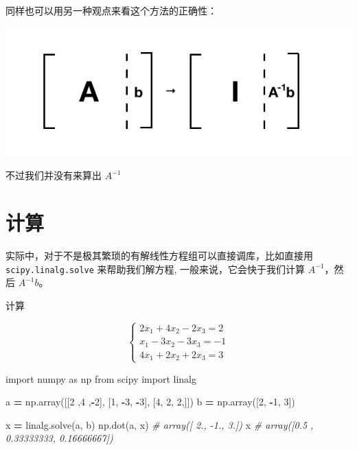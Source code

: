 \documentclass[
]{book}
\newenvironment{Shaded}{\begin{snugshade}}{\end{snugshade}}
\newcommand{\CommentTok}[1]{\textcolor[rgb]{0.56,0.35,0.01}{\textit{#1}}}
\newcommand{\DecValTok}[1]{\textcolor[rgb]{0.00,0.00,0.81}{#1}}
\newcommand{\ImportTok}[1]{#1}
\newcommand{\NormalTok}[1]{#1}
\newcommand{\OperatorTok}[1]{\textcolor[rgb]{0.81,0.36,0.00}{\textbf{#1}}}
\begin{document}
同样也可以用另一种观点来看这个方法的正确性：

\includegraphics{images/Gauss_04_PLU_done.png}

不过我们并没有来算出 \(A^{-1}\)

\hypertarget{ux8ba1ux7b97}{%
\section{计算}\label{ux8ba1ux7b97}}

实际中，对于不是极其繁琐的有解线性方程组可以直接调库，比如直接用 \texttt{scipy.linalg.solve} 来帮助我们解方程, 一般来说，它会快于我们计算 \(A^{-1}\)，然后 \(A^{-1}b\)。

计算

\[
\begin{cases}
2x_1 + 4x_2 - 2x_3 = 2 \\
x_1 - 3x_2 - 3x_3 = -1\\
4x_1 + 2x_2 + 2x_3 = 3
\end{cases}
\]

\begin{Shaded}
\begin{Highlighting}[]
\ImportTok{import}\NormalTok{ numpy }\ImportTok{as}\NormalTok{ np}
\ImportTok{from}\NormalTok{ scipy }\ImportTok{import}\NormalTok{ linalg}

\NormalTok{a }\OperatorTok{=}\NormalTok{ np.array([[}\DecValTok{2}\NormalTok{ ,}\DecValTok{4}\NormalTok{ ,}\OperatorTok{{-}}\DecValTok{2}\NormalTok{],}
\NormalTok{              [}\DecValTok{1}\NormalTok{, }\OperatorTok{{-}}\DecValTok{3}\NormalTok{, }\OperatorTok{{-}}\DecValTok{3}\NormalTok{],}
\NormalTok{              [}\DecValTok{4}\NormalTok{, }\DecValTok{2}\NormalTok{, }\DecValTok{2}\NormalTok{,]])}
\NormalTok{b }\OperatorTok{=}\NormalTok{ np.array([}\DecValTok{2}\NormalTok{, }\OperatorTok{{-}}\DecValTok{1}\NormalTok{, }\DecValTok{3}\NormalTok{])}

\NormalTok{x }\OperatorTok{=}\NormalTok{ linalg.solve(a, b)}
\NormalTok{np.dot(a, x) }\CommentTok{\# array([ 2., {-}1.,  3.])}
\NormalTok{x }\CommentTok{\# array([0.5       , 0.33333333, 0.16666667])}
\end{Highlighting}
\end{Shaded}
\end{document}
